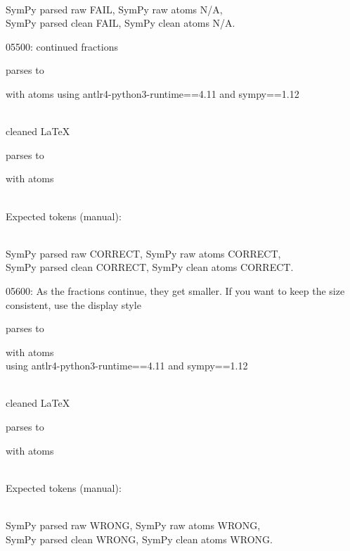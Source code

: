 \documentclass{article}
\begin{document}
\ \\
SymPy parsed raw FAIL, 
SymPy raw atoms N/A, \\
SymPy parsed clean FAIL, 
SymPy clean atoms N/A.

\hrulefill

05500:
continued fractions
    
parses to

with atoms
using antlr4-python3-runtime==4.11 and sympy==1.12

\ \\
cleaned \LaTeX

parses to

with atoms


\ \\
Expected tokens (manual):




\ \\
SymPy parsed raw CORRECT, 
SymPy raw atoms CORRECT, \\
SymPy parsed clean CORRECT, 
SymPy clean atoms CORRECT.

\hrulefill

05600:
As the fractions continue, they get smaller. If you want to keep the size consistent, use the display style

parses to

with atoms
\\
using antlr4-python3-runtime==4.11 and sympy==1.12

\ \\
cleaned \LaTeX

parses to

with atoms


\ \\
Expected tokens (manual):


\ \\
SymPy parsed raw WRONG, 
SymPy raw atoms WRONG, \\
SymPy parsed clean WRONG, 
SymPy clean atoms WRONG.
\end{document}
